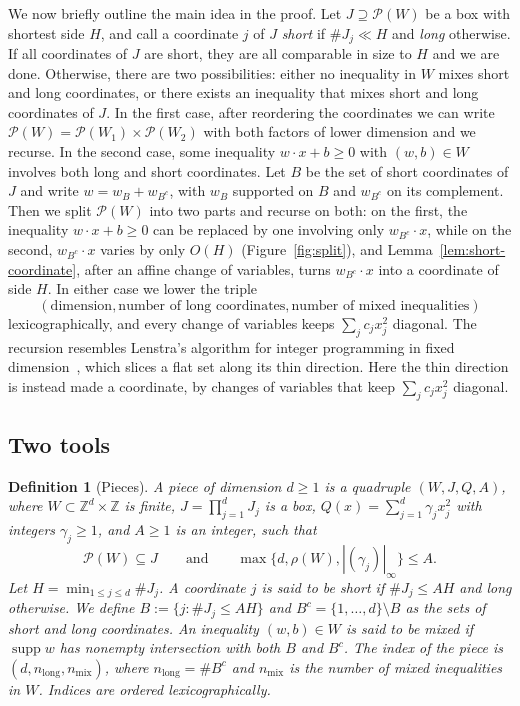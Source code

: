\documentclass[a4paper,reqno,12pt]{amsart}
\theoremstyle{plain}
\theoremstyle{plain}
\newtheorem{definition}[theorem]{Definition}
\theoremstyle{remark}
\theoremstyle{plain}
\newcommand{\cP}{\mathscr{P}}
\newcommand{\Z}{\mathbb{Z}}
\newcommand{\supp}{\operatorname{supp}}
\theoremstyle{plain}
\theoremstyle{plain}
\begin{document}
{We now briefly outline the main idea in the proof. 
Let $J\supseteq\cP(W)$ be a box with shortest side $H$, and call a coordinate $j$ of $J$
\emph{short} if $\#J_j\ll H$ and \emph{long} otherwise. If all coordinates of $J$ are short, they
are all comparable in size to $H$ and we are done. Otherwise, there are two possibilities: either no
inequality in $W$ mixes short and long coordinates, or there exists an inequality that mixes short
and long coordinates of $J$. In the first case, after reordering the coordinates we can 
write $\cP(W) = \cP(W_1) \times \cP(W_2)$ with both factors of lower dimension and we recurse. 
In the second case, some inequality $w \cdot x+b\geq 0$ with $(w,b) \in W$ involves both long and short
coordinates. Let $B$ be the set of short coordinates of $J$
and write $w=w_B+w_{B^c}$, with $w_B$ supported on $B$ and $w_{B^c}$ on its complement. Then
we split $\cP(W)$ into two parts and recurse on both: on the first, the inequality $w \cdot x + b \geq 0$ can be replaced 
by one involving only $w_{B^c}\cdot x${, while} on the second, $w_{B^c}\cdot x$ varies by only $O(H)$
(Figure~\ref{fig:split}), and Lemma~\ref{lem:short-coordinate}, after an affine change of variables,
turns $w_{B^c} \cdot x$ into a coordinate of side $H$. In either case we lower 
the triple 
$$(\text{dimension}, \text{number of long coordinates}, \text{number of mixed inequalities})$$
lexicographically, and every change of variables keeps $\sum_jc_jx_j^2$ diagonal.
The recursion resembles Lenstra's algorithm for integer programming in fixed
dimension~\cite{Len}, which slices a flat set along its thin direction{. Here} the
thin direction is instead made a coordinate, by changes of variables that keep
$\sum_jc_jx_j^2$ diagonal.

\subsection{Two tools}\label{sec:tools}

\begin{definition}[Pieces]\label{def:piece}
A \emph{piece} of dimension $d\ge1$ is a quadruple $(W,J,Q,A)$, where $W\subset\Z^d\times\Z$ is finite,
$J=\prod_{j=1}^dJ_j$ is a box, $Q(x)=\sum_{j=1}^d\gamma_jx_j^2$ with integers $\gamma_j\ge1$, and
$A\ge1$ is an integer, such that
\[
 \cP(W)\subseteq J\qquad\text{and}\qquad\max\{d,\rho(W),|(\gamma_j)|_\infty\}\le A.
\]
Let $H=\min_{1\le j\le d}\#J_j$. A coordinate $j$ is said to be \emph{short} if $\#J_j\le AH$ and \emph{long}
otherwise. We define $B:=\{j : \#J_j \leq AH\}$ and $B^c=\{1,\ldots,d\}\setminus B$ as the sets of short and long coordinates. An
inequality $(w,b)\in W$ is said to be \emph{mixed} if $\supp w$ has nonempty intersection with both $B$ and $B^c$.
The \emph{index} of the piece is $(d,n_{\mathrm{long}},n_{\mathrm{mix}})$, where $n_{\mathrm{long}}=\#B^c$ and $n_{\mathrm{mix}}$ is the number of mixed inequalities in $W$. Indices are ordered lexicographically.
\end{definition}

}
\end{document}
